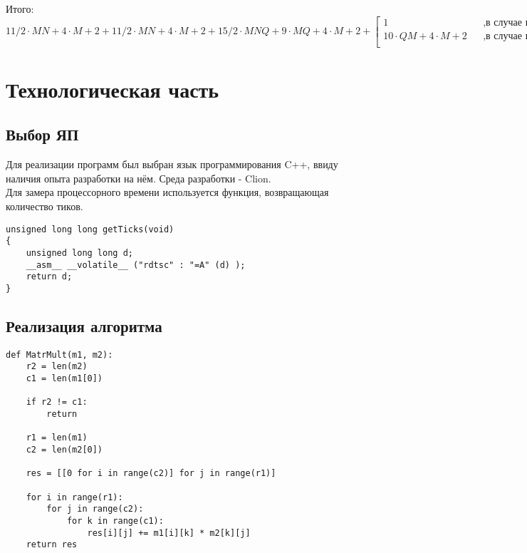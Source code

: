 \documentclass[12pt]{report}
\begin{document}
Итого: $11/2 \cdot M  N + 4 \cdot M + 2 + 11/2 \cdot M  N + 4 \cdot M + 2 + 15/2 \cdot M  N Q + 9 \cdot M Q + 4 \cdot M + 2 +
       \begin{bmatrix}
             1    &&, \text{в случае невыполнения условия}\\
             10 \cdot QM + 4 \cdot M + 2 &&, \text{в случае выполнения условия}\\
           \end{bmatrix} $ \\



\chapter{Технологическая часть}
\section{Выбор ЯП}
Для реализации программ был выбран язык программирования C++, ввиду наличия опыта разработки на нём. Среда разработки - Clion. \\

Для замера процессорного времени используется функция, возвращающая количество тиков.\\

\begin{lstlisting}[label=some-code,caption=Функция получения тиков]
unsigned long long getTicks(void)
{
    unsigned long long d;
    __asm__ __volatile__ ("rdtsc" : "=A" (d) );
    return d;
}

\end{lstlisting}

\section{Реализация алгоритма}

\begin{lstlisting}[label=some-code,caption=Функция классического умножения матриц]
def MatrMult(m1, m2):
	r2 = len(m2)
	c1 = len(m1[0])
	
	if r2 != c1:
		return
	
	r1 = len(m1)
	c2 = len(m2[0])
	
	res = [[0 for i in range(c2)] for j in range(r1)]
	
	for i in range(r1):
		for j in range(c2):
			for k in range(c1):
				res[i][j] += m1[i][k] * m2[k][j]
	return res
\end{lstlisting}
\end{document}
